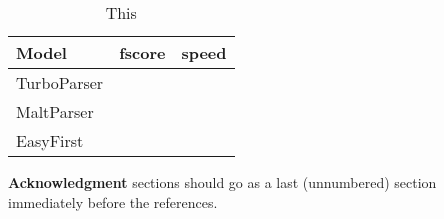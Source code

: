 \documentclass[11pt,letterpaper]{article}
\begin{document}
\begin{table}
  \centering
  \begin{tabular}{l|ll}
    Model & fscore & speed  \\
    \hline
    TurboParser & & \\
    MaltParser & & \\
    EasyFirst & & \\
  \end{tabular}
  \caption{This }
\end{table}

\textbf{Acknowledgment} sections should go as a last (unnumbered) section immediately
before the references.



\end{document}
